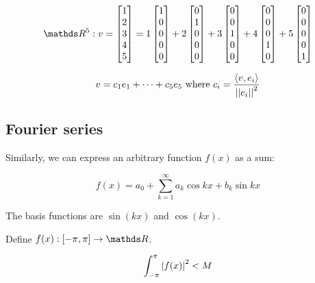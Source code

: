 \[
  \bbR^5 : v = \begin{bmatrix}
    1 \\ 2 \\ 3 \\ 4 \\ 5
  \end{bmatrix} = 
  1 \begin{bmatrix} 1 \\ 0 \\ 0 \\ 0 \\ 0  \end{bmatrix} +
  2 \begin{bmatrix} 0 \\ 1 \\ 0 \\ 0 \\ 0 \end{bmatrix} +
  3 \begin{bmatrix} 0 \\ 0 \\ 1 \\ 0 \\ 0 \end{bmatrix} +
  4 \begin{bmatrix} 0 \\ 0 \\ 0 \\ 1 \\ 0 \end{bmatrix} +
  5 \begin{bmatrix} 0 \\ 0 \\ 0 \\ 0 \\ 1 \end{bmatrix}
\]

\[
  v = c_1 e_1 + \dots + c_5 e_5 \text{ where } c_i = {\langle v, e_i \rangle \over \left|\left|e_i\right|\right|^2}
\]

\subsection{Fourier series}

Similarly, we can express an arbitrary function $f(x)$ as a sum:

\[
  f(x) = a_0 + \sum_{k=1}^\infty a_k \cos{kx} + b_k \sin{kx}
\]

The basis functions are $\sin(kx)$ and $\cos(kx)$.

Define $f(x) : [-\pi,\pi] \to \bbR$.

\[
  \int_{-\pi}^\pi \left|f(x)\right|^2 < M
\]

